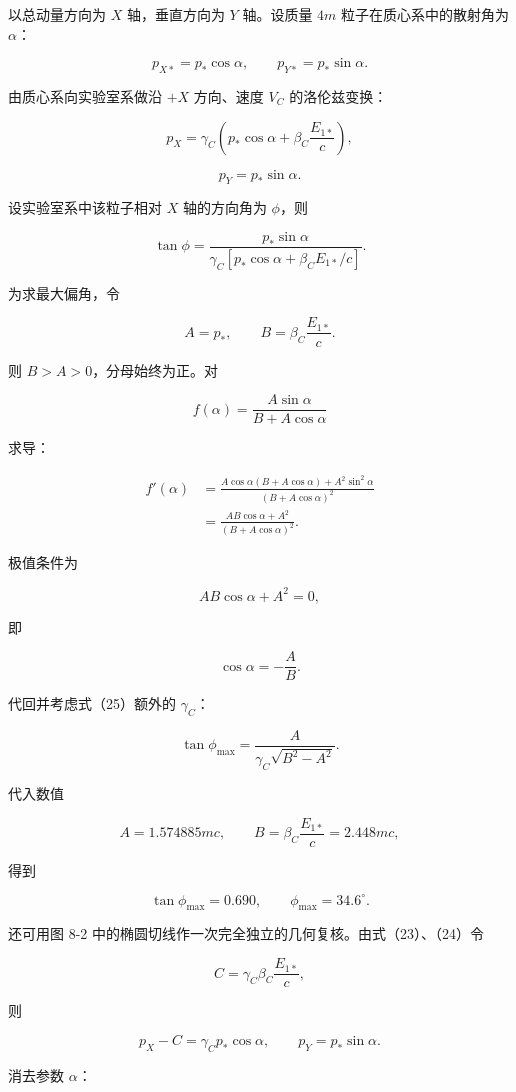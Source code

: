 \documentclass[12pt,a4paper,UTF8]{ctexart}
\begin{document}
以总动量方向为 \(X\) 轴，垂直方向为 \(Y\) 轴。设质量 \(4m\)
粒子在质心系中的散射角为 \(\alpha\)：

\[
p_{X*}=p_*\cos\alpha,
\qquad
p_{Y*}=p_*\sin\alpha.
\tag{22}
\]

由质心系向实验室系做沿 \(+X\) 方向、速度 \(V_C\) 的洛伦兹变换：

\[
p_X
=\gamma_C\left(p_*\cos\alpha
+\beta_C\frac{E_{1*}}c\right),
\tag{23}
\]

\[
p_Y=p_*\sin\alpha.
\tag{24}
\]

设实验室系中该粒子相对 \(X\) 轴的方向角为 \(\phi\)，则

\[
\tan\phi
=\frac{p_*\sin\alpha}
{\gamma_C[p_*\cos\alpha+\beta_CE_{1*}/c]}.
\tag{25}
\]

为求最大偏角，令

\[
A=p_*,
\qquad
B=\beta_C\frac{E_{1*}}c.
\tag{26}
\]

则 \(B>A>0\)，分母始终为正。对

\[
f(\alpha)=\frac{A\sin\alpha}{B+A\cos\alpha}
\tag{27}
\]

求导：

\[
\begin{aligned}
f'(\alpha)
&=\frac{A\cos\alpha(B+A\cos\alpha)
+A^2\sin^2\alpha}
{(B+A\cos\alpha)^2}\\
&=\frac{AB\cos\alpha+A^2}
{(B+A\cos\alpha)^2}.
\end{aligned}
\tag{28}
\]

极值条件为

\[
AB\cos\alpha+A^2=0,
\tag{29}
\]

即

\[
\cos\alpha=-\frac AB.
\tag{30}
\]

代回并考虑式（25）额外的 \(\gamma_C\)：

\[
\tan\phi_{\max}
=\frac{A}{\gamma_C\sqrt{B^2-A^2}}.
\tag{31}
\]

代入数值

\[
A=1.574885mc,
\qquad
B=\beta_C\frac{E_{1*}}c
=2.448mc,
\tag{32}
\]

得到

\[
\tan\phi_{\max}=0.690,
\qquad
\boxed{\phi_{\max}=34.6^\circ}.
\tag{33}
\]

还可用图 8-2 中的椭圆切线作一次完全独立的几何复核。由式（23）、（24）令

\[
C=\gamma_C\beta_C\frac{E_{1*}}c,
\]

则

\[
p_X-C=\gamma_Cp_*\cos\alpha,
\qquad
p_Y=p_*\sin\alpha.
\tag{33a}
\]

消去参数 \(\alpha\)：
\end{document}
